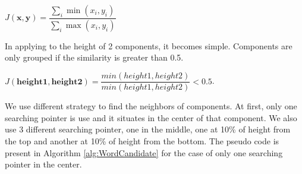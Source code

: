 \begin{center}
    $J(\mathbf{x}, \mathbf{y}) = \dfrac{\sum_i \min(x_i, y_i)}{\sum_i \max(x_i, y_i)}$ 
\end{center}
    
In applying to the height of 2 components, it becomes simple. Components are only grouped if the similarity is greater than 0.5.

\begin{center}
$J(\mathbf{height1},\mathbf{height2}) = \dfrac{min(height1,height2)}{min(height1,height2)} < 0.5$. 
\end{center}


\par We use different strategy to find the neighbors of components. At first, only one searching pointer is use and it situates in the center of that component. We also use 3 different searching pointer, one in the middle, one at 10\% of height from the top and another at 10\% of height from the bottom. 
The pseudo code is present in Algorithm \ref{alg:WordCandidate} for the case of only one searching pointer in the center.

